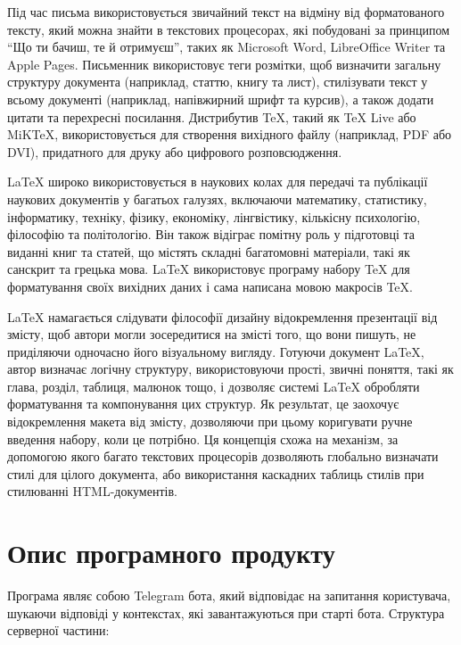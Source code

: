 \documentclass[a4paper,14pt]{extreport}
\begin{document}
    Під час письма використовується звичайний текст на відміну від форматованого тексту, який можна знайти в текстових процесорах, які побудовані за принципом ``Що ти бачиш, те й отримуєш'', таких як Microsoft Word, LibreOffice Writer та Apple Pages. Письменник використовує теги розмітки, щоб визначити загальну структуру документа (наприклад, статтю, книгу та лист), стилізувати текст у всьому документі (наприклад, напівжирний шрифт та курсив), а також додати цитати та перехресні посилання. Дистрибутив TeX, такий як TeX Live або MiKTeX, використовується для створення вихідного файлу (наприклад, PDF або DVI), придатного для друку або цифрового розповсюдження.

    LaTeX широко використовується в наукових колах \cite{latex:friends} \cite{latex:oss-devs-latex} для передачі та публікації наукових документів у багатьох галузях, включаючи математику, статистику, інформатику, техніку, фізику, економіку, лінгвістику, кількісну психологію, філософію та політологію. Він також відіграє помітну роль у підготовці та виданні книг та статей, що містять складні багатомовні матеріали, такі як санскрит та грецька мова. LaTeX використовує програму набору TeX для форматування своїх вихідних даних і сама написана мовою макросів TeX.

    LaTeX намагається слідувати філософії дизайну відокремлення презентації від змісту, щоб автори могли зосередитися на змісті того, що вони пишуть, не приділяючи одночасно його візуальному вигляду. Готуючи документ LaTeX, автор визначає логічну структуру, використовуючи прості, звичні поняття, такі як глава, розділ, таблиця, малюнок тощо, і дозволяє системі LaTeX обробляти форматування та компонування цих структур. Як результат, це заохочує відокремлення макета від змісту, дозволяючи при цьому коригувати ручне введення набору, коли це потрібно. Ця концепція схожа на механізм, за допомогою якого багато текстових процесорів дозволяють глобально визначати стилі для цілого документа, або використання каскадних таблиць стилів при стилюванні HTML-документів.

\section{Опис програмного продукту}
    Програма являє собою Telegram бота, який відповідає на запитання користувача, шукаючи відповіді у контекстах, які завантажуються при старті бота. 
    Структура серверної частини:
\end{document}
